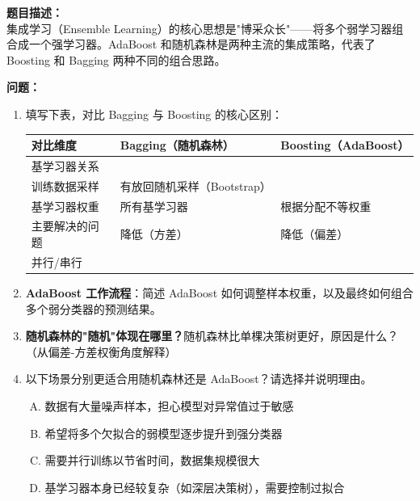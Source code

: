 \documentclass[a4paper,11pt]{ctexart}
\begin{document}
\begin{problembox}
    \textbf{题目描述：}\\
    集成学习（Ensemble Learning）的核心思想是"博采众长"——将多个弱学习器组合成一个强学习器。AdaBoost 和随机森林是两种主流的集成策略，代表了 Boosting 和 Bagging 两种不同的组合思路。

    \vspace{0.3cm}
    \textbf{问题：}
    \begin{enumerate}[(1)]
        \item 填写下表，对比 Bagging 与 Boosting 的核心区别：

        \begin{center}
        \begin{tabular}{p{3.5cm} p{4.2cm} p{4.2cm}}
            \toprule
            对比维度 & Bagging（随机森林） & Boosting（AdaBoost） \\
            \midrule
            基学习器关系 & \underline{\hspace{3.5cm}} & \underline{\hspace{3.5cm}} \\[1.2em]
            训练数据采样 & 有放回随机采样（Bootstrap） & \underline{\hspace{3.5cm}} \\[1.2em]
            基学习器权重 & 所有基学习器\underline{\hspace{1.5cm}} & 根据\underline{\hspace{2cm}}分配不等权重 \\[1.2em]
            主要解决的问题 & 降低\underline{\hspace{1cm}}（方差） & 降低\underline{\hspace{1cm}}（偏差） \\[1.2em]
            并行/串行 & \underline{\quad} & \underline{\quad} \\
            \bottomrule
        \end{tabular}
        \end{center}

        \item \textbf{AdaBoost 工作流程}：简述 AdaBoost 如何调整样本权重，以及最终如何组合多个弱分类器的预测结果。

        \item \textbf{随机森林的"随机"体现在哪里？}随机森林比单棵决策树更好，原因是什么？（从偏差-方差权衡角度解释）

        \item 以下场景分别更适合用随机森林还是 AdaBoost？请选择并说明理由。
        \begin{enumerate}[A.]
            \item 数据有大量噪声样本，担心模型对异常值过于敏感
            \item 希望将多个欠拟合的弱模型逐步提升到强分类器
            \item 需要并行训练以节省时间，数据集规模很大
            \item 基学习器本身已经较复杂（如深层决策树），需要控制过拟合
        \end{enumerate}
    \end{enumerate}


\end{problembox}
\end{document}
